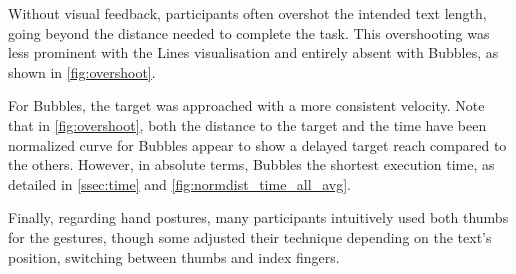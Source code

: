 Without visual feedback, participants often overshot the intended text length, going beyond the distance needed to complete the task.
This overshooting was less prominent with the Lines visualisation and entirely absent with Bubbles, as shown in \cref{fig:overshoot}. 

For Bubbles, the target was approached with a more consistent velocity.
Note that in \cref{fig:overshoot}, both the distance to the target and the time have been normalized curve for Bubbles appear to show a delayed target reach compared to the others. 
However, in absolute terms, Bubbles  the shortest execution time, as detailed in \cref{ssec:time} and \cref{fig:normdist_time_all_avg}.

Finally, regarding hand postures, many participants intuitively used both thumbs for the gestures, though some adjusted their technique depending on the text's position, switching between thumbs and index fingers. 

